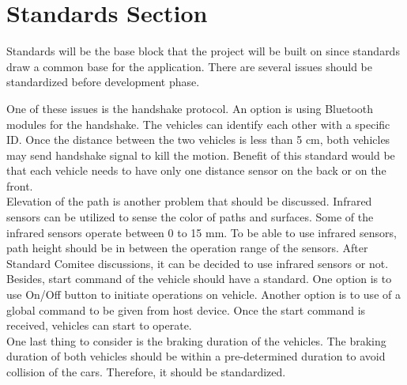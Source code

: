 \documentclass[a4paper,12pt]{article}
\begin{document}
	
	
	
	




	

\section{Standards Section}
Standards will be the base block that the project will be built on since standards draw a common base for the application. There are several issues should be standardized before development phase. 

One of these issues is the handshake protocol. An option is using Bluetooth modules for the handshake. The vehicles can identify each other with a specific ID. Once the distance between the two vehicles is less than 5 cm, both vehicles may send handshake signal to kill the motion. Benefit of this standard would be that each vehicle needs to have only one distance sensor on the back or on the front.\\

Elevation of the path is another problem that should be discussed. Infrared sensors can be utilized to sense the color of paths and surfaces. Some of the infrared sensors operate between 0 to 15 mm. To be able to use infrared sensors, path height should be in between the operation range of the sensors. After Standard Comitee discussions, it can be decided to use infrared sensors or not.\\

Besides, start command of the vehicle should have a standard. One option is to use On/Off button to initiate operations on vehicle. Another option is to use of a global command to be given from host device. Once the start command is received, vehicles can start to operate.\\

One last thing to consider is the braking duration of the vehicles. The braking duration of both vehicles should be within a pre-determined duration to avoid collision of the cars. Therefore, it should be standardized.      
\end{document}
